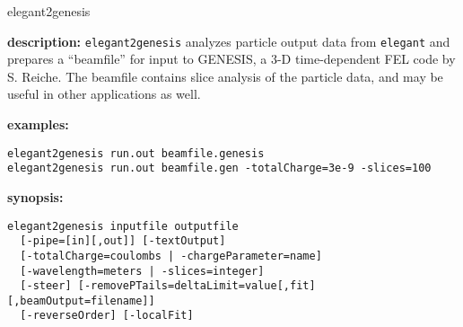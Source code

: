 \begin{sddsprog}{elegant2genesis}
  \item {\bf description:}
  \verb|elegant2genesis| analyzes particle output data from \verb|elegant| and prepares
  a ``beamfile'' for input to GENESIS\cite{GENESIS}, a 3-D time-dependent FEL code by
  S. Reiche.  The beamfile contains slice analysis of the particle data, and may be
  useful in other applications as well.

  \item {\bf examples:}
  \begin{verbatim}
elegant2genesis run.out beamfile.genesis
elegant2genesis run.out beamfile.gen -totalCharge=3e-9 -slices=100
  \end{verbatim}

  \item {\bf synopsis:}
  \begin{verbatim}
elegant2genesis inputfile outputfile
  [-pipe=[in][,out]] [-textOutput]
  [-totalCharge=coulombs | -chargeParameter=name]
  [-wavelength=meters | -slices=integer]
  [-steer] [-removePTails=deltaLimit=value[,fit][,beamOutput=filename]]
  [-reverseOrder] [-localFit]
  \end{verbatim}


\end{sddsprog}
